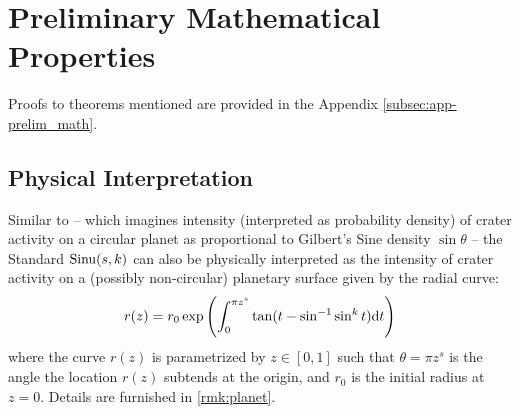 \section{Preliminary Mathematical Properties}
Proofs to theorems mentioned are provided in the Appendix \autoref{subsec:app-prelim_math}.

\subsection{Physical Interpretation}
Similar to \cite{gilbert1893moon} -- which imagines intensity (interpreted as probability density) of crater activity on a circular planet as proportional to Gilbert's Sine density $\sin\theta$ -- the Standard \sindist{} $\operatorname*{Sinu}(s,k)$ can also be physically interpreted as the intensity of crater activity on a (possibly non-circular) planetary surface given by the radial curve:
\begin{equation}
	r(z) = r_0 \exp\left(\int_0^{\pi z^s} \tan(t - \sin^{-1}\sin^k t) \mathrm d t\right)
\end{equation}
where the curve $r(z)$ is parametrized by $z \in [0,1]$ such that $\theta=\pi z^s$ is the angle the location $r(z)$ subtends at the origin, and $r_0$ is the initial radius at $z=0$. Details are furnished in \autoref{rmk:planet}.

	

